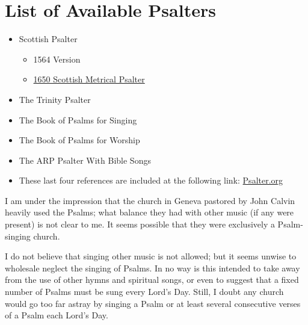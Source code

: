 \documentclass{article}
\begin{document}
\section{List of Available Psalters}


\begin{itemize}

	\item Scottish Psalter
		\begin{itemize}
			\item 1564 Version
			\item \href{https://thewestminsterstandard.org/1650-scottish-metrical-psalter/}{1650 Scottish Metrical Psalter}
		\end{itemize}
	\item The Trinity Psalter
	\item The Book of Psalms for Singing
	\item The Book of Psalms for Worship
	\item The ARP Psalter With Bible Songs
	\item These last four references are included at the following link:
		\href{www.psalter.org}{Psalter.org} 
\end{itemize}

I am under the impression that the church in Geneva pastored by John Calvin heavily used the Psalms; what balance they had with other music (if any were present) is not clear to me.  It seems possible that they were exclusively a Psalm-singing church.  

I do not believe that singing other music is not allowed; but it seems unwise to wholesale neglect the singing of Psalms.  In no way is this intended to take away from the use of other hymns and spiritual songs, or even to suggest that a fixed number of Psalms must be sung every Lord's Day.  Still, I doubt any church would go too far astray by singing a Psalm or at least several consecutive verses of a Psalm each Lord's Day.
\end{document}
